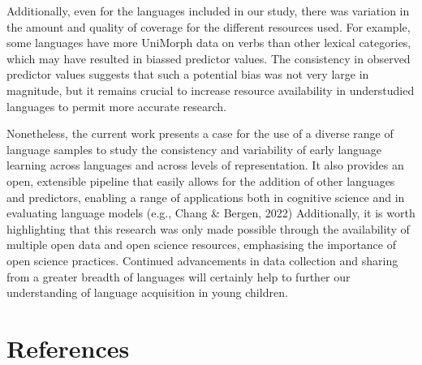 \documentclass[10pt, letterpaper]{article}
\begin{document}
Additionally, even for the languages included in our study, there was
variation in the amount and quality of coverage for the different
resources used. For example, some languages have more UniMorph data on
verbs than other lexical categories, which may have resulted in biassed
predictor values. The consistency in observed predictor values suggests
that such a potential bias was not very large in magnitude, but it
remains crucial to increase resource availability in understudied
languages to permit more accurate research.

Nonetheless, the current work presents a case for the use of a diverse
range of language samples to study the consistency and variability of
early language learning across languages and across levels of
representation. It also provides an open, extensible pipeline that
easily allows for the addition of other languages and predictors,
enabling a range of applications both in cognitive science and in
evaluating language models (e.g., Chang \& Bergen, 2022) Additionally,
it is worth highlighting that this research was only made possible
through the availability of multiple open data and open science
resources, emphasising the importance of open science practices.
Continued advancements in data collection and sharing from a greater
breadth of languages will certainly help to further our understanding of
language acquisition in young children.

\hypertarget{references}{%
\section{References}\label{references}}

\setlength{\parindent}{-0.1in} 
\setlength{\leftskip}{0.125in}

\noindent
\end{document}
